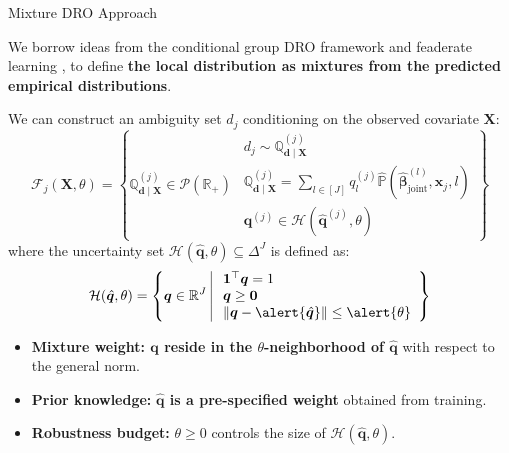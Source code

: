 \documentclass{beamer}
\newcommand{\mb}[1]{{\mathbf{#1}}}
\newcommand{\txrd}[1]{{\textcolor{sintefred}{\textbf{#1}}}}
\newcommand{\bbp}{\mathbb{P}}
\newcommand{\bbq}{\mathbb{Q}}
\newcommand{\bbr}{\mathbb{R}}
\begin{document}

\begin{frame}{Mixture DRO Approach}

We borrow ideas from the conditional group DRO framework and feaderate learning  \citep{marfoq2021federated, wang2025distributionally}, to define \txrd{the local distribution as mixtures from the predicted empirical distributions}. 

\vspace{0.3cm}
We can construct an ambiguity set $d_j$ conditioning on the observed covariate $\mb X$:
{\large 
\[
\mathcal{F}_j(\mb X, \theta) = \left \{ 
	\bbq^{(j)}_{\bm d \mid \mb X} \in \mathcal{P}(\bbr_+) \ 
	\begin{array}{|ll} 
	\ d_j \sim \bbq^{(j)}_{\bm d \mid \mb X}	\\ 
	\
	\bbq^{(j)}_{\bm d \mid \mb X} = \sum_{l \in [J]} q_l^{(j)} \hat{\bbp}(\hat{\bm \beta}_{\text{joint}}^{(l)},\bm x_j, l)  \\
	\ \bm q^{(j)} \in \mathcal{H}(\hat{\bm q}^{(j)} , \theta)
	\end{array}
	\right  \}
\]
}
where the uncertainty set $\mathcal{H}(\hat{\bm q}, \theta) \subseteq \Delta^J$ is defined as:
{\large
\[
\mathcal{H}(\hat{\bm q}, \theta) = \left \{ \bm q \in \bbr^J \
\begin{array}{|ll} \
	\bm 1 ^\top \bm q = 1 \\
	\ \bm q \geq \bm 0 \\
	\ \|\bm q - \alert{\hat{\bm q}} \| \leq \alert{\theta}
\end{array}
\right \} 
\]
}
\begin{itemize}
    \item \txrd{Mixture weight: $\bm q$ reside in the $\theta$-neighborhood of $\hat{\bm q}$} with respect to the general norm. 
    \item \txrd{Prior knowledge:} \txrd{$\hat{\bm q}$ is a pre-specified weight} obtained from training. 
    \item \txrd{Robustness budget:} $\theta \geq 0$ controls the size of $\mathcal{H}(\hat{\bm q}, \theta)$.
\end{itemize}

\end{frame}

\end{document}
